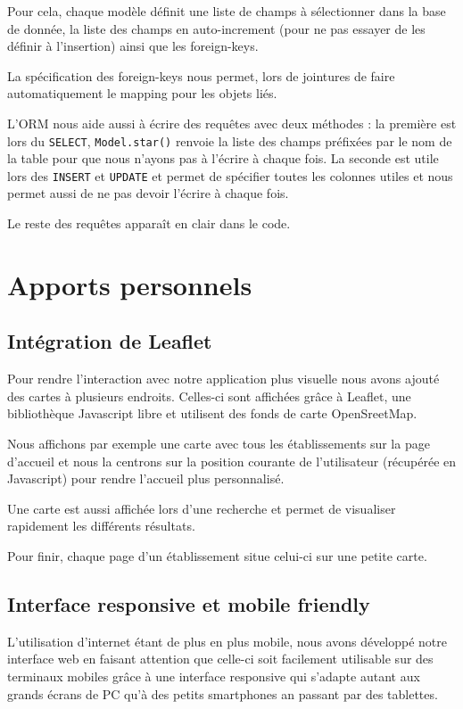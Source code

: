 \documentclass[10pt,a4paper]{article}
\begin{document}
Pour cela, chaque modèle définit une liste de champs à sélectionner dans la base de donnée, la liste des champs en auto-increment (pour ne pas essayer de les définir à l'insertion) ainsi que les foreign-keys.

La spécification des foreign-keys nous permet, lors de jointures de faire automatiquement le mapping pour les objets liés.

L'ORM nous aide aussi à écrire des requêtes avec deux méthodes : la première est lors du \texttt{SELECT}, \texttt{Model.star()} renvoie la liste des champs préfixées par le nom de la table pour que nous n'ayons pas à l'écrire à chaque fois. La seconde est utile lors des \texttt{INSERT} et \texttt{UPDATE} et permet de spécifier toutes les colonnes utiles et nous permet aussi de ne pas devoir l'écrire à chaque fois.

Le reste des requêtes apparaît en clair dans le code.

\section{Apports personnels}

\subsection{Intégration de Leaflet}

Pour rendre l’interaction avec notre application plus visuelle nous avons ajouté des cartes à plusieurs endroits. Celles-ci sont affichées grâce à Leaflet, une bibliothèque Javascript libre et utilisent des fonds de carte OpenSreetMap.

Nous affichons par exemple une carte avec tous les établissements sur la page d'accueil et nous la centrons sur la position courante de l'utilisateur (récupérée en Javascript) pour rendre l'accueil plus personnalisé.

Une carte est aussi affichée lors d'une recherche et permet de visualiser rapidement les différents résultats.

Pour finir, chaque page d'un établissement situe celui-ci sur une petite carte.

\subsection{Interface responsive et mobile friendly}

L'utilisation d'internet étant de plus en plus mobile, nous avons développé notre interface web en faisant attention que celle-ci soit facilement utilisable sur des terminaux mobiles grâce à une interface responsive qui s'adapte autant aux grands écrans de PC qu'à des petits smartphones an passant par des tablettes.
\end{document}
